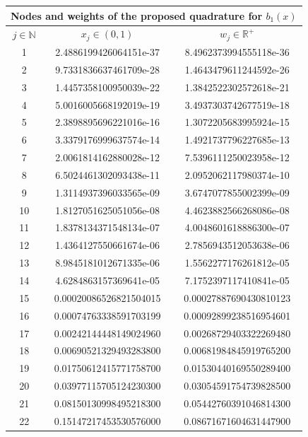 \documentclass[a4paper, twosided]{book}
\begin{document}
\vspace{0.2cm}
\begin{table}[H]
\centering
\begin{tabular}{|c||c|c|}
\hline
\multicolumn{3}{|c|}{\textbf{Nodes and weights of the proposed quadrature for $b_1(x)$ }} \\
\hline
$j\in\mathbb{N}$ & $x_j\in(0,1)$ & $w_j\in\mathbb{R}^+$ \\
\hline
1   &  2.4886199426064151e-37  &  8.4962373994555118e-36  \\
2   &  9.7331836637461709e-28  &  1.4643479611244592e-26  \\
3   &  1.4457358100950039e-22  &  1.3842522302572618e-21  \\
4   &  5.0016005668192019e-19  &  3.4937303742677519e-18  \\
5   &  2.3898895696221016e-16  &  1.3072205683995924e-15  \\
6   &  3.3379176999637574e-14  &  1.4921737796227685e-13  \\
7   &  2.0061814162880028e-12  &  7.5396111250023958e-12  \\
8   &  6.5024461302093438e-11  &  2.0952062117980374e-10  \\
9   &  1.3114937396033565e-09  &  3.6747077855002399e-09  \\
10  &  1.8127051625051056e-08  &  4.4623882566268086e-08  \\
11  &  1.8378134371548134e-07  &  4.0048601618886300e-07  \\
12  &  1.4364127550661674e-06  &  2.7856943512053638e-06  \\
13  &  8.9845181012671335e-06  &  1.5562277176261812e-05  \\
14  &  4.6284863157369641e-05  &  7.1752397117410841e-05  \\
15  &  0.00020086526821504015  &  0.00027887690430810123  \\
16  &  0.00074763338591703199  &  0.00092899238516954601  \\
17  &  0.00242144448149024960  &  0.00268729403322269480  \\
18  &  0.00690521329493283800  &  0.00681984845919765200  \\
19  &  0.01750612415771758700  &  0.01530440169550289400  \\
20  &  0.03977115705124230300  &  0.03054591754739828500  \\
21  &  0.08150130998495218300  &  0.05442760391046814300  \\
22  &  0.15147217453530576000  &  0.08671671604631447900  \\

\end{tabular}
\end{table}
\end{document}
